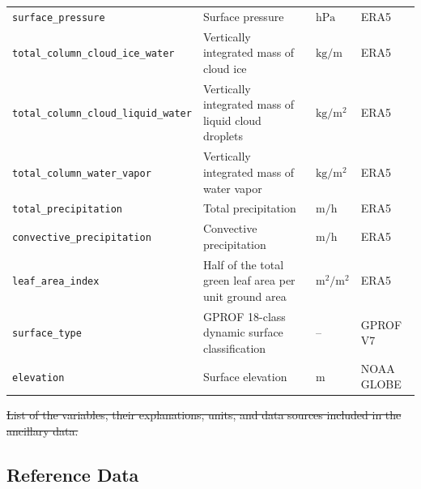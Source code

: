 \documentclass[11pt]{article}
\providecommand{\DIFdel}[1]{{\protect\color{red}\sout{#1}}}                      %
\providecommand{\DIFdelFL}[1]{\DIFdel{#1}} %
\providecommand{\DIFdelbeginFL}{} %
\providecommand{\DIFdelendFL}{} %
\begin{document}
\begin{table}[htbp]
\begin{tabular}{lp{4cm}ll}
		\texttt{surface\_pressure}                   & Surface pressure                                       & $\si{\hecto \pascal}$                       & ERA5            \\
		\texttt{total\_column\_cloud\_ice\_water}    & Vertically integrated mass of cloud ice                & $\si{\kilo \gram \per \meter}$              & ERA5            \\
		\texttt{total\_column\_cloud\_liquid\_water} & Vertically integrated mass of liquid cloud droplets    & $\si{\kilo \gram \per \meter \squared}$     & ERA5            \\
		\texttt{total\_column\_water\_vapor}         & Vertically integrated mass of water vapor              & $\si{\kilo \gram \per \meter \squared}$     & ERA5            \\
		\texttt{total\_precipitation}                & Total precipitation                                    & $\si{\meter \per \hour}$                    & ERA5            \\
		\texttt{convective\_precipitation}           & Convective precipitation                               & $\si{\meter \per \hour}$                    & ERA5            \\
		\texttt{leaf\_area\_index}                   & Half of the total green leaf area per unit ground area & $\si{\meter \squared \per \meter \squared}$ & ERA5            \\
		\texttt{surface\_type}                       & GPROF 18-class dynamic surface classification          & --                                          & GPROF V7        \\
		\texttt{elevation}                           & Surface elevation                                      & $\si{\meter}$                               & NOAA GLOBE      \\
		\bottomrule
	\end{tabular}
\DIFdelbeginFL %
{%
\DIFdelFL{List of the variables, their explanations, units, and data sources included in the ancillary data.}}
\DIFdelendFL \end{table}


\subsection{Reference Data}
\end{document}
